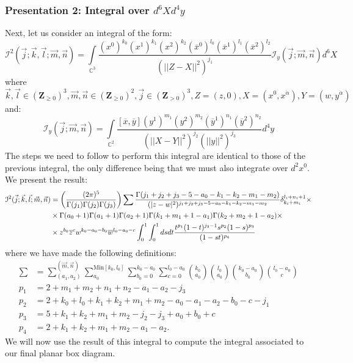 \documentclass[../main.tex]{subfiles}
\begin{document}
\subsubsection{Presentation 2: Integral over $d^6X d^4y$}

Next, let us consider an integral of the form:
\begin{equation}
    \mathcal{I}^2(\vec{j};\vec{k},\vec{l};\vec{m}, \vec{n}) = \underset{\mathbb{C}^3}{\int} \frac{ (x^0)^{k_0} (x^1)^{k_1} (x^2)^{k_2} (\overline{x}^0)^{l_0} (\overline{x}^1)^{l_1} (\overline{x}^2)^{l_2}}{(\vert \vert Z-X \vert \vert^2)^{j_1}} \mathcal{I}_y (\vec{j};\vec{m}, \vec{n}) d^6X \label{eq:main type 2}
\end{equation}
where $\vec{k},\vec{l} \in (\mathbf{Z}_{\geq 0})^3, \vec{m},\vec{n} \in (\mathbf{Z}_{\geq 0})^2, \vec{j} \in (\mathbf{Z}_{>0})^3, Z = (z,0), X = (x^0,x^{\dot{\alpha}}), Y = (w,y^{\dot{\alpha}})$ and:  
\begin{equation}
    \mathcal{I}_y (\vec{j};\vec{m}, \vec{n}) = \underset{\mathbb{C}^2}{\int} \frac{[\overline{x},\overline{y}] (y^1)^{m_1} (y^2)^{m_2} (\overline{y}^1)^{n_1} (\overline{y}^2)^{n_2}}{(\vert \vert X-Y \vert \vert^2)^{j_2} (\vert \vert y \vert \vert^2)^{j_3}} d^4y
\end{equation}
The steps we need to follow to perform this integral are identical to those of the previous integral, the only difference being that we must also integrate over $d^2x^0$. We present the result: 
\begingroup \allowdisplaybreaks \begin{align}\label{eq:noncentralintegral}
\mathcal{I}^2(\vec{j};\vec{k},\vec{l};\vec{m}, \vec{n}) &= \bigg(\frac{(2\pi)^5}{\Gamma(j_1) \Gamma(j_2) \Gamma(j_3)}\bigg) \sum \frac{\Gamma(j_1+j_2+j_3-5-a_0-k_1-k_2-m_1-m_2)}{(\vert z-w \vert^2)^{j_1+j_2+j_3-5-a_0-k_1-k_2-m_1-m_2}} \delta_{k_i+m_i}^{l_i+n_i+1} \times \notag \\
&\times  \Gamma(a_0+1) \Gamma(a_1+1) \Gamma(a_2+1) \Gamma(k_1+m_1+1-a_1) \Gamma(k_2+m_2+1-a_2) \times \notag \\
&\times z^{b_0} \overline{z}^c w^{k_0-a_0-b_0} \overline{w}^{l_0-a_0-c} \int_0^1 \int_0^1 ds dt \frac{t^{p_1} (1-t)^{j_3-1} s^{p_2} (1-s)^{p_3}}{(1-st)^{p_4}}
\end{align} \endgroup
where we have made the following definitions:
\begingroup \allowdisplaybreaks \begin{align}
\sum & = \sum_{(a_1,a_2)}^{(\vec{m},\vec{n})} \sum_{a_0}^{\text{Min}[k_0,l_0]} \sum_{b_0=0}^{k_0-a_0} \sum_{c=0}^{l_0-a_0} {k_0 \choose a_0} {l_0 \choose a_0} {k_0-a_0 \choose b_0} {l_0-a_0 \choose c} \\
    p_1 &= 2+m_1+m_2+n_1+n_2-a_1-a_2-j_3 \\ p_2 &= 2+k_0+l_0+k_1+k_2+m_1+m_2-a_0-a_1-a_2-b_0-c-j_1 \\  p_3 &= 5+k_1+k_2+m_1+m_2-j_2-j_3+a_0+b_0+c \\ p_4 &= 2+k_1+k_2+m_1+m_2-a_1-a_2.
\end{align} \endgroup
%
We will now use the result of this integral to compute the integral associated to our final planar box diagram. 
\end{document}

